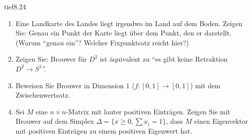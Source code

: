 \begin{karte}{tief}{8.24}{\typtypisch}{}
\begin{enumerate}[label=(\alph*),leftmargin=1.6em,itemsep=2pt]
\item Eine Landkarte des Landes liegt irgendwo im Land auf dem Boden. Zeigen Sie: Genau ein Punkt der Karte liegt über dem Punkt, den er darstellt. (Warum \enquote{genau ein}? Welcher Fixpunktsatz reicht hier?)
\item Zeigen Sie: Brouwer für $D^{2}$ ist äquivalent zu \enquote{es gibt keine Retraktion $D^{2}\to S^{1}$}.
\item Beweisen Sie Brouwer in Dimension $1$ ($f\colon[0, 1]\to[0, 1]$) mit dem Zwischenwertsatz.
\item Sei $M$ eine $n\times n$-Matrix mit lauter positiven Einträgen. Zeigen Sie mit Brouwer auf dem Simplex $\Delta = \{x\ge0, \sum x_i = 1\}$, dass $M$ einen Eigenvektor mit positiven Einträgen zu einem positiven Eigenwert hat.
\end{enumerate}
\end{karte}

